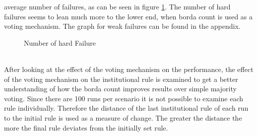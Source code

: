 \documentclass[a4paper]{article}
\begin{document}
average number of failures, as can be seen in figure \ref{d_hard}. The number of hard failures seems to lean 
much more to the lower end, when borda count is used as a voting mechanism. The graph for weak failures can be found 
in the appendix. \\
\begin{figure}[!ht]
\caption{Number of hard Failure}
\label{d_hard}
\end{figure}\\
After looking at the effect of the voting mechanism on the performance, the effect of the voting mechanism on the institutional rule 
is examined to get a better understanding of how the borda count improves results over simple majority voting. Since there are 
100 runs per scenario it is not possible to examine each rule individually. Therefore the distance of the last institutional rule 
of each run to the initial rule is used as a measure of change. The greater the distance the more the final rule deviates from 
the initially set rule. 
\end{document}
